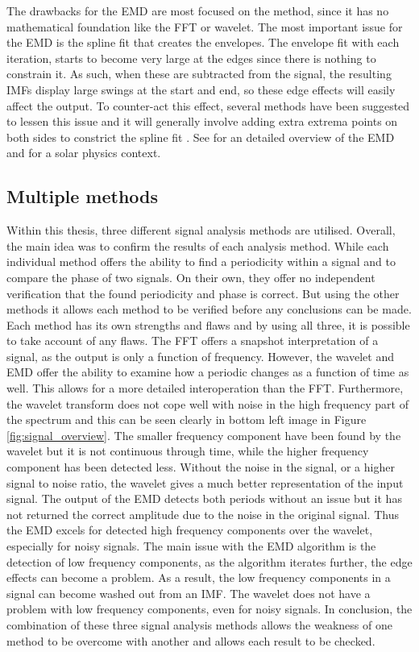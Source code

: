     The drawbacks for the EMD are most focused on the method, since it has no mathematical foundation like the FFT or wavelet.
    The most important issue for the EMD is the spline fit that creates the envelopes.
    The envelope fit with each iteration, starts to become very large at the edges since there is nothing to constrain it.
    As such, when these are subtracted from the signal, the resulting IMFs display large swings at the start and end, so these edge effects will easily affect the output.
    To counter-act this effect, several methods have been suggested to lessen this issue and it will generally involve adding extra extrema points on both sides to constrict the spline fit \citep{zeng2004simple}.
    See \cite{huang} for an detailed overview of the EMD and \cite{terradas} for a solar physics context.

\subsection{Multiple methods}    

    Within this thesis, three different signal analysis methods are utilised.
    Overall, the main idea was to confirm the results of each analysis method.
    While each individual method offers the ability to find a periodicity within a signal and to compare the phase of two signals. 
    On their own, they offer no independent verification that the found periodicity and phase is correct. 
    But using the other methods it allows each method to be verified before any conclusions can be made.
    Each method has its own strengths and flaws and by using all three, it is possible to take account of any flaws.
    The FFT offers a snapshot interpretation of a signal, as the output is only a function of frequency. 
    However, the wavelet and EMD offer the ability to examine how a periodic changes as a function of time as well.
    This allows for a more detailed interoperation than the FFT.  
    Furthermore, the wavelet transform does not cope well with noise in the high frequency part of the spectrum and this can be seen clearly in bottom left image in Figure \ref{fig:signal_overview}.
    The smaller frequency component have been found by the wavelet but it is not continuous through time, while the higher frequency component has been detected less.
    Without the noise in the signal, or a higher signal to noise ratio, the wavelet gives a much better representation of the input signal. 
    The output of the EMD detects both periods without an issue but it has not returned the correct amplitude due to the noise in the original signal. 
    Thus the EMD excels for detected high frequency components over the wavelet, especially for noisy signals.
    The main issue with the EMD algorithm is the detection of low frequency components, as the algorithm iterates further, the edge effects can become a problem.
    As a result, the low frequency components in a signal can become washed out from an IMF. 
    The wavelet does not have a problem with low frequency components, even for noisy signals. 
    In conclusion, the combination of these three signal analysis methods allows the weakness of one method to be overcome with another and allows each result to be checked.
  
